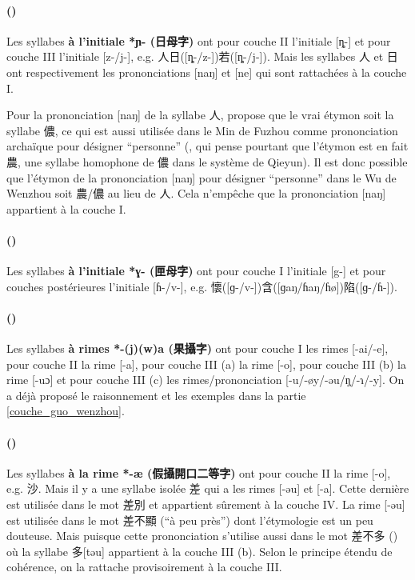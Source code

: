 \documentclass{scrbook}
\newcounter{c}[subsubsection]
\newcommand{\stpc}[1]{\stepcounter{#1}}
\newcommand{\termyyx}[1]{\textbf{#1}}
\begin{document}
\begin{sloppypar}
\stpc{c}\paragraph{()}
Les syllabes \termyyx{à l'initiale *ɲ- (日母字)} ont pour couche II l'initiale [ȵ-] et pour couche III l'initiale [z-/j-], e.g. 人日([ȵ-/z-])若([ȵ-/j-]). Mais les syllabes 人 et 日 ont respectivement les prononciations [naŋ] et [ne] qui sont rattachées à la couche I. 

Pour la prononciation [naŋ] de la syllabe 人, \textcite[105]{Zhengzhang2008wenzhou} propose que le vrai étymon soit la syllabe 儂, ce qui est aussi utilisée dans le Min de Fuzhou comme prononciation archaïque pour désigner ``personne'' (\cite[331]{Feng1998Fuzhou}, qui pense pourtant que l'étymon est en fait 農, une syllabe homophone de 儂 dans le système de Qieyun). Il est donc possible que l'étymon de la prononciation [naŋ] pour désigner ``personne'' dans le Wu de Wenzhou soit 農/儂 au lieu de 人. Cela n'empêche que la prononciation [naŋ] appartient à la couche I. 

\stpc{c}\paragraph{()}
Les syllabes \termyyx{à l'initiale *ɣ- (匣母字)} ont pour couche I l'initiale [g-] et pour couches postérieures l'initiale [ɦ-/v-], e.g. 懷([ɡ-/v-])含([ɡaŋ/ɦaŋ/ɦø])陷([ɡ-/ɦ-]).

\stpc{c}\paragraph{()}
Les syllabes \termyyx{à rimes *-(j)(w)a (果攝字)} ont pour couche I les rimes [-ai/-e], pour couche II la rime [-a], pour couche III (a) la rime [-o], pour couche III (b) la rime [-uɔ] et pour couche III (c) les rimes/prononciation [-u/-øy/-əu/ŋ̩/-ɿ/-y]. On a déjà proposé le raisonnement et les exemples dans la partie \ref{couche_guo_wenzhou}.

\stpc{c}\paragraph{()}
Les syllabes \termyyx{à la rime *-æ (假攝開口二等字)} ont pour couche II la rime [-o], e.g. 沙. Mais il y a une syllabe isolée 差 qui a les rimes [-əu] et [-a]. Cette dernière est utilisée dans le mot 差別 et appartient sûrement à la couche IV. La rime [-əu] est utilisée dans le mot 差不顯 (``à peu près'') dont l'étymologie est un peu douteuse. Mais puisque cette prononciation s'utilise aussi dans le mot 差不多 (\cite[291]{You1998Wenzhou}) où la syllabe 多[təu] appartient à la couche III (b). Selon le principe étendu de cohérence, on la rattache provisoirement à la couche III.


\end{sloppypar}
\end{document}
